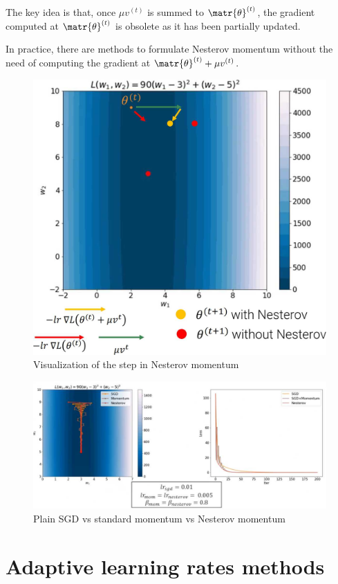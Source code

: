 \begin{description}
        \begin{remark}
            The key idea is that, once $\mu v^{(t)}$ is summed to $\matr{\theta}^{(t)}$, the gradient computed at $\matr{\theta}^{(t)}$ is obsolete as it has been partially updated.
        \end{remark}

        \begin{remark}
            In practice, there are methods to formulate Nesterov momentum without the need of computing the gradient at $\matr{\theta}^{(t)} + \mu v^{(t)}$.
        \end{remark}

        \begin{figure}[H]
            \centering
            \includegraphics[width=0.35\linewidth]{./img/nesterov_momentum.jpg}
            \caption{Visualization of the step in Nesterov momentum}
        \end{figure}

        \begin{figure}[H]
            \centering
            \includegraphics[width=0.75\linewidth]{./img/nesterov_comparison.jpg}
            \caption{Plain SGD vs standard momentum vs Nesterov momentum}
        \end{figure}
\end{description}



\section{Adaptive learning rates methods}


